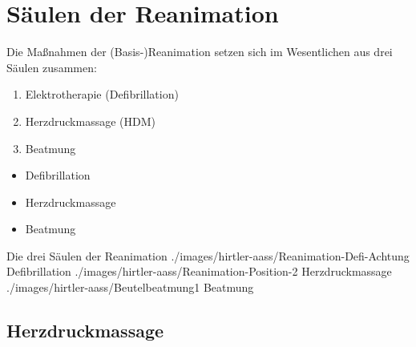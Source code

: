 
\section{Säulen der Reanimation}



{Die Maßnahmen der (Basis-)Reanimation setzen sich im
Wesentlichen aus drei Säulen zusammen:
\begin{enumerate}
  \item Elektrotherapie (Defibrillation)
  \item Herzdruckmassage (HDM)
  \item Beatmung
\end{enumerate} }{
\begin{itemize}
  \item Defibrillation
  \item Herzdruckmassage
  \item Beatmung
\end{itemize}
}{}{}{}

\begin{PictureSeries}{}{Die drei Säulen der Reanimation
}
{./images/hirtler-aass/Reanimation-Defi-Achtung}
{Defibrillation}
{./images/hirtler-aass/Reanimation-Position-2}
{Herzdruckmassage}
{./images/hirtler-aass/Beutelbeatmung1}
{Beatmung}
{}
{}
\end{PictureSeries}

\subsection{Herzdruckmassage}

